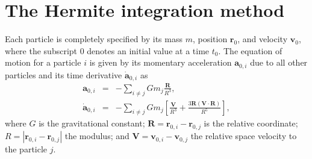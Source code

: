 
\section{The Hermite integration method} \label{ch:hermite}


Each particle is completely specified by its mass $m$,
position $\mathbf r_0$, and velocity $\mathbf v_0$,
where the sub\-script $0$ denotes an initial value at a
time $t_0$.
The equation of motion for a particle $i$ is given by
its momentary acceleration $\mathbf a_{0,i}$ due to
all other particles and its time derivative
$\dot{\mathbf a}_{0,i}$ as
%
\begin{eqnarray}
\mathbf a_{0,i} &=& -\sum_{i \neq j} G m_j\frac{\mathbf R}{R^3} ,
                 \label{eq:accel0}\\
%
\dot{\mathbf a}_{0,i} &=& -\sum_{i \neq j} G m_j
          \left [ \frac{\mathbf V}{R^3}
                  + \frac{3\mathbf R(\mathbf V \cdot \mathbf R)}{R^5}
          \right ] , \label{eq:accel1}
\end{eqnarray}
%
where $G$ is the gravitational constant;
$\mathbf R = \mathbf r_{0,i} - \mathbf r_{0,j}$ is
the relative coordinate;
$R = |\mathbf r_{0,i} - \mathbf r_{0,j}|$ the modulus;
and $\mathbf V = \mathbf v_{0,i} - \mathbf v_{0,j}$
the relative space velocity to the particle $j$.

